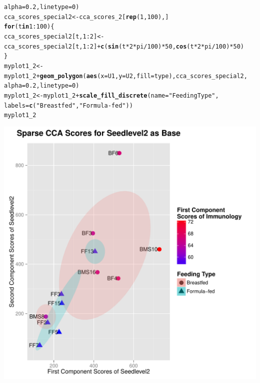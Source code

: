 \documentclass[12pt]{article}\usepackage[]{graphicx}\usepackage[]{color}
\makeatletter
\def\maxwidth{ %
  \ifdim\Gin@nat@width>\linewidth
    \linewidth
  \else
    \Gin@nat@width
  \fi
}
\newcommand{\hlnum}[1]{\textcolor[rgb]{0.686,0.059,0.569}{#1}}%
\newcommand{\hlstr}[1]{\textcolor[rgb]{0.192,0.494,0.8}{#1}}%
\newcommand{\hlopt}[1]{\textcolor[rgb]{0,0,0}{#1}}%
\newcommand{\hlstd}[1]{\textcolor[rgb]{0.345,0.345,0.345}{#1}}%
\newcommand{\hlkwa}[1]{\textcolor[rgb]{0.161,0.373,0.58}{\textbf{#1}}}%
\newcommand{\hlkwb}[1]{\textcolor[rgb]{0.69,0.353,0.396}{#1}}%
\newcommand{\hlkwc}[1]{\textcolor[rgb]{0.333,0.667,0.333}{#1}}%
\newcommand{\hlkwd}[1]{\textcolor[rgb]{0.737,0.353,0.396}{\textbf{#1}}}%
\newenvironment{kframe}{%
 \def\at@end@of@kframe{}%
 \ifinner\ifhmode%
  \def\at@end@of@kframe{\end{minipage}}%
  \begin{minipage}{\columnwidth}%
 \fi\fi%
 \def\FrameCommand##1{\hskip\@totalleftmargin \hskip-\fboxsep
 \colorbox{shadecolor}{##1}\hskip-\fboxsep
     \hskip-\linewidth \hskip-\@totalleftmargin \hskip\columnwidth}%
 \MakeFramed {\advance\hsize-\width
   \@totalleftmargin\z@ \linewidth\hsize
   \@setminipage}}%
 {\par\unskip\endMakeFramed%
 \at@end@of@kframe}
\newenvironment{knitrout}{}{} %
\makeatother
\begin{document}
\begin{knitrout}
\begin{kframe}
\begin{alltt}
                                    \hlkwc{alpha}\hlstd{=}\hlnum{0.2}\hlstd{,}\hlkwc{linetype}\hlstd{=}\hlnum{0}\hlstd{)}
\hlstd{cca_scores_special2}\hlkwb{<-}\hlstd{cca_scores_2[}\hlkwd{rep}\hlstd{(}\hlnum{1}\hlstd{,}\hlnum{100}\hlstd{),]}
\hlkwa{for}\hlstd{(t} \hlkwa{in} \hlnum{1}\hlopt{:}\hlnum{100}\hlstd{)\{}
 \hlstd{cca_scores_special2[t,}\hlnum{1}\hlopt{:}\hlnum{2}\hlstd{]}\hlkwb{<-}\hlstd{cca_scores_special2[t,}\hlnum{1}\hlopt{:}\hlnum{2}\hlstd{]}\hlopt{+}\hlkwd{c}\hlstd{(}\hlkwd{sin}\hlstd{(t}\hlopt{*}\hlnum{2}\hlopt{*}\hlstd{pi}\hlopt{/}\hlnum{100}\hlstd{)}\hlopt{*}\hlnum{50}\hlstd{,}\hlkwd{cos}\hlstd{(t}\hlopt{*}\hlnum{2}\hlopt{*}\hlstd{pi}\hlopt{/}\hlnum{100}\hlstd{)}\hlopt{*}\hlnum{50}\hlstd{)}
\hlstd{\}}
\hlstd{myplot1_2}\hlkwb{<-}\hlstd{myplot1_2}\hlopt{+}\hlkwd{geom_polygon}\hlstd{(}\hlkwd{aes}\hlstd{(}\hlkwc{x}\hlstd{=U1,}\hlkwc{y}\hlstd{=U2,}\hlkwc{fill}\hlstd{=type),cca_scores_special2,}
                                    \hlkwc{alpha}\hlstd{=}\hlnum{0.2}\hlstd{,}\hlkwc{linetype}\hlstd{=}\hlnum{0}\hlstd{)}
\hlstd{myplot1_2}\hlkwb{<-}\hlstd{myplot1_2}\hlopt{+}\hlkwd{scale_fill_discrete}\hlstd{(}\hlkwc{name}\hlstd{=}\hlstr{"Feeding Type"}\hlstd{,}
                                         \hlkwc{labels}\hlstd{=}\hlkwd{c}\hlstd{(}\hlstr{"Breastfed"}\hlstd{,}\hlstr{"Formula-fed"}\hlstd{))}
\hlstd{myplot1_2}
\end{alltt}
\end{kframe}
\includegraphics[width=\maxwidth]{figure/plot2-2} 

\end{knitrout}
\end{document}
